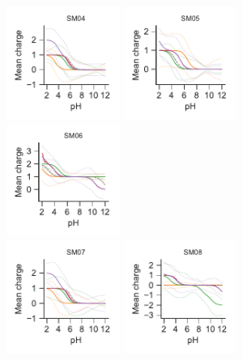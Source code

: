 \documentclass[9pt,lineno,final]{elife}
\begin{document}
\begin{figure}[H]
		\includegraphics[width=0.33\textwidth]{Reports/overview-virtual-titration-SM04.pdf}
	\includegraphics[width=0.33\textwidth]{Reports/overview-virtual-titration-SM05.pdf}
	\includegraphics[width=0.33\textwidth]{Reports/overview-virtual-titration-SM06.pdf}	 \\
		\includegraphics[width=0.33\textwidth]{Reports/overview-virtual-titration-SM07.pdf}
	\includegraphics[width=0.33\textwidth]{Reports/overview-virtual-titration-SM08.pdf}

\end{figure}
\end{document}
